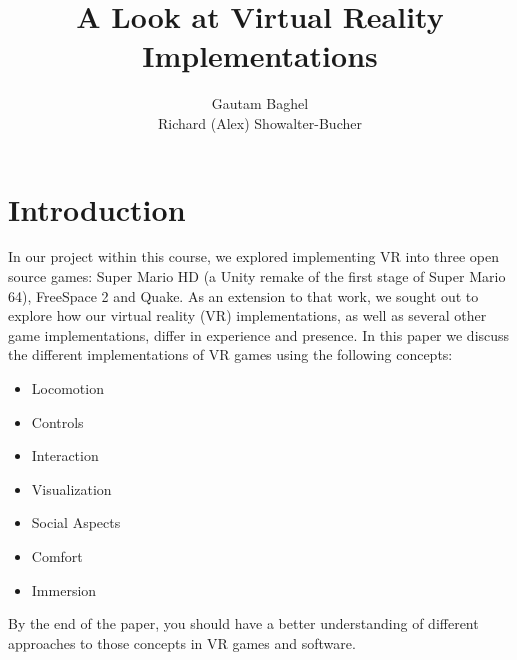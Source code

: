 \documentclass[journal]{IEEEtran}
\begin{document}
%
\title{A Look at Virtual Reality Implementations}
%
%
%

\author{Gautam Baghel\\Richard (Alex) Showalter-Bucher}

	\maketitle



\newpage
\tableofcontents
\newpage

\section{Introduction}
In our project within this course, we explored implementing VR into three open source games: Super Mario HD (a Unity remake of the first stage of Super Mario 64), FreeSpace 2 and Quake. As an extension to that work, we sought out to explore how our virtual reality (VR) implementations, as well as several other game implementations, differ in experience and presence. In this paper we discuss the different implementations of VR games using the following concepts:


\begin{itemize}
	\item Locomotion
	\item Controls
	\item Interaction
	\item Visualization
	\item Social Aspects
	\item Comfort
	\item Immersion
\end{itemize}

 
By the end of the paper, you should have a better understanding of different approaches to those concepts in VR games and software. 
\end{document}
